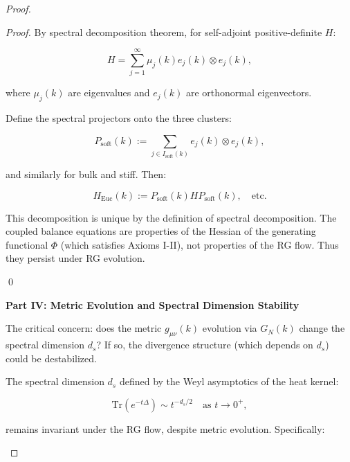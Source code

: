 \begin{proof}
\begin{lemma}
\begin{proof}
By spectral decomposition theorem, for self-adjoint positive-definite $H$:

\begin{equation}
H = \sum_{j=1}^\infty \mu_j(k) e_j(k) \otimes e_j(k),
\end{equation}

where $\mu_j(k)$ are eigenvalues and $e_j(k)$ are orthonormal eigenvectors.

Define the spectral projectors onto the three clusters:

\begin{equation}
P_{\mathrm{soft}}(k) := \sum_{j \in I_{\mathrm{soft}}(k)} e_j(k) \otimes e_j(k),
\end{equation}

and similarly for bulk and stiff. Then:

\begin{equation}
H_{\mathrm{Euc}}(k) := P_{\mathrm{soft}}(k) H P_{\mathrm{soft}}(k), \quad \text{etc.}
\end{equation}

This decomposition is unique by the definition of spectral decomposition. The coupled balance equations are properties of the Hessian of the generating functional $\Phi$ (which satisfies Axioms I-II), not properties of the RG flow. Thus they persist under RG evolution.

\qed

\end{proof}

\end{lemma}

\noindent\textbf{Part IV: Metric Evolution and Spectral Dimension Stability}

The critical concern: does the metric $g_{\mu\nu}(k)$ evolution via $G_N(k)$ change the spectral dimension $d_s$? If so, the divergence structure (which depends on $d_s$) could be destabilized.

\begin{lemma}
\label{lem:spectralDimensionStability}

The spectral dimension $d_s$ defined by the Weyl asymptotics of the heat kernel:

\begin{equation}
\mathrm{Tr}(e^{-t\Delta}) \sim t^{-d_s/2} \quad \text{as } t \to 0^+,
\end{equation}

remains invariant under the RG flow, despite metric evolution. Specifically:


\end{lemma}
\end{proof}

